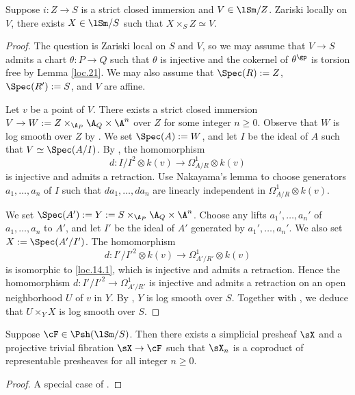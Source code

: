 \documentclass[10pt]{amsart}
\begin{document}
\begin{lem}
\label{loc.14}
Suppose $i\colon Z\to S$ is a strict closed immersion and $V\in \lSm/Z$.
Zariski locally on $V$, there exists $X\in \lSm/S$ such that $X\times_S Z\simeq V$.
\end{lem}
\begin{proof}
The question is Zariski local on $S$ and $V$, so we may assume that $V\to S$ admits a chart $\theta \colon P\to Q$ such that $\theta$ is injective and the cokernel of $\theta^\gp$ is torsion free by Lemma \ref{loc.21}.
We may also assume that $\Spec(R):=Z$, $\Spec(R'):=S$, and $V$ are affine.

Let $v$ be a point of $V$.
There exists a strict closed immersion $V\to W:=Z\times_{\A_P} \A_Q \times \A^n$ over $Z$ for some integer $n\geq 0$.
Observe that $W$ is log smooth over $Z$ by \cite[Theorem IV.3.1.8]{Ogu}.
We set $\Spec(A):=W$, and let $I$ be the ideal of $A$ such that $V\simeq \Spec(A/I)$.
By \cite[Theorem IV.3.2.2]{Ogu}, the homomorphism
\begin{equation}
\label{loc.14.1}
d\colon I/I^2 \otimes k(v)\to \Omega_{A/R}^1\otimes k(v)
\end{equation}
is injective and admits a retraction.
Use Nakayama's lemma to choose generators $a_1,\ldots,a_n$ of $I$ such that $da_1,\ldots,da_n$ are linearly independent in $\Omega_{A/R}^1\otimes k(v)$.

We set $\Spec(A'):=Y:=S\times_{\A_P}\A_Q \times \A^n$.
Choose any lifts $a_1',\ldots,a_n'$ of $a_1,\ldots,a_n$ to $A'$, and let $I'$ be the ideal of $A'$ generated by $a_1',\ldots,a_n'$.
We also set $X:=\Spec(A'/I')$.
The homomorphism
\[
d\colon I'/I'^2\otimes k(v)
\to
\Omega_{A'/R'}^1\otimes k(v)
\]
is isomorphic to \eqref{loc.14.1}, which is injective and admits a retraction.
Hence the homomorphism $d\colon I'/ I'^2\to \Omega_{A'/R'}^1$ is injective and admits a retraction on an open neighborhood $U$ of $v$ in $Y$.
By \cite[Theorem IV.3.1.8]{Ogu}, $Y$ is log smooth over $S$.
Together with \cite[Theorem IV.3.2.2]{Ogu}, we deduce that $U\times_Y X$ is log smooth over $S$.
\end{proof}

\begin{lem}
\label{loc.15}
Suppose $\cF\in \Psh(\lSm/S)$.
Then there exists a simplicial presheaf $\sX$ and a projective trivial fibration $\sX\to \cF$ such that $\sX_n$ is a coproduct of representable presheaves for all integer $n\geq 0$.
\end{lem}
\begin{proof}
A special case of \cite[Lemma 1.16, p.\ 52]{MV}.
\end{proof}
\end{document}
